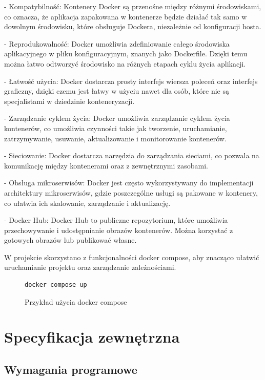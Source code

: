 \documentclass[a4paper,twoside,12pt]{book}
\begin{document}
- Kompatybilność:
    Kontenery Docker są przenośne między różnymi środowiskami, co oznacza, że aplikacja zapakowana w kontenerze będzie działać tak samo w dowolnym środowisku, które obsługuje Dockera, niezależnie od konfiguracji hosta.

- Reprodukowalność:
    Docker umożliwia zdefiniowanie całego środowiska aplikacyjnego w pliku konfiguracyjnym, znanych jako Dockerfile. Dzięki temu można łatwo odtworzyć środowisko na różnych etapach cyklu życia aplikacji.

- Łatwość użycia:
    Docker dostarcza prosty interfejs wiersza poleceń oraz interfejs graficzny, dzięki czemu jest łatwy w użyciu nawet dla osób, które nie są specjalistami w dziedzinie konteneryzacji.

- Zarządzanie cyklem życia:
    Docker umożliwia zarządzanie cyklem życia kontenerów, co umożliwia czynności takie jak tworzenie, uruchamianie, zatrzymywanie, usuwanie, aktualizowanie i monitorowanie kontenerów.

- Sieciowanie:
    Docker dostarcza narzędzia do zarządzania sieciami, co pozwala na komunikację między kontenerami oraz z zewnętrznymi zasobami.

- Obsługa mikroserwisów:
        Docker jest często wykorzystywany do implementacji architektury mikroserwisów, gdzie poszczególne usługi są pakowane w kontenery, co ułatwia ich skalowanie, zarządzanie i aktualizację.

- Docker Hub:
    Docker Hub to publiczne repozytorium, które umożliwia przechowywanie i udostępnianie obrazów kontenerów. Można korzystać z gotowych obrazów lub publikować własne.

W projekcie skorzystano z funkcjonalności docker compose, aby znacząco ułatwić uruchamianie projektu oraz zarządzanie zależnościami.

\begin{figure}[H]
\centering
\begin{lstlisting}
docker compose up
\end{lstlisting}
\caption{Przykład użycia docker compose}
\label{fig:pseudokod:listings}
\end{figure}


\chapter{Specyfikacja zewnętrzna}
\label{ch:04}

\section{Wymagania programowe}
\end{document}
